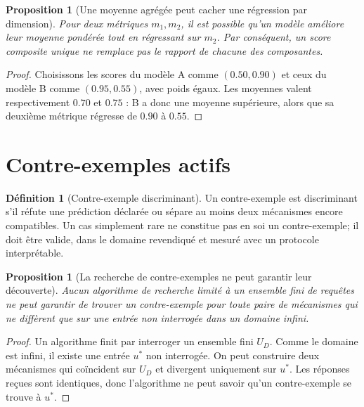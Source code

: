 \documentclass[11pt,oneside]{book}
\newtheorem{proposition}[theoreme]{Proposition}
\theoremstyle{definition}
\newtheorem{definition}[theoreme]{Définition}
\theoremstyle{remark}
\newcommand{\1}{\mathbf 1}
\begin{document}
\begin{proposition}[Une moyenne agrégée peut cacher une régression par dimension]
Pour deux métriques $m_1,m_2$, il est possible qu'un modèle améliore leur moyenne pondérée tout en régressant sur $m_2$. Par conséquent, un score composite unique ne remplace pas le rapport de chacune des composantes.
\end{proposition}
\begin{proof}
Choisissons les scores du modèle A comme $(0.50,0.90)$ et ceux du modèle B comme $(0.95,0.55)$, avec poids égaux. Les moyennes valent respectivement $0.70$ et $0.75$ : B a donc une moyenne supérieure, alors que sa deuxième métrique régresse de $0.90$ à $0.55$.\end{proof}

\section{Contre-exemples actifs}
\begin{definition}[Contre-exemple discriminant]
Un contre-exemple est discriminant s'il réfute une prédiction déclarée ou sépare au moins deux mécanismes encore compatibles. Un cas simplement rare ne constitue pas en soi un contre-exemple; il doit être valide, dans le domaine revendiqué et mesuré avec un protocole interprétable.
\end{definition}

\begin{proposition}[La recherche de contre-exemples ne peut garantir leur découverte]
Aucun algorithme de recherche limité à un ensemble fini de requêtes ne peut garantir de trouver un contre-exemple pour toute paire de mécanismes qui ne diffèrent que sur une entrée non interrogée dans un domaine infini.
\end{proposition}
\begin{proof}
Un algorithme finit par interroger un ensemble fini $U_D$. Comme le domaine est infini, il existe une entrée $u^*$ non interrogée. On peut construire deux mécanismes qui coïncident sur $U_D$ et divergent uniquement sur $u^*$. Les réponses reçues sont identiques, donc l'algorithme ne peut savoir qu'un contre-exemple se trouve à $u^*$.\end{proof}
\end{document}
